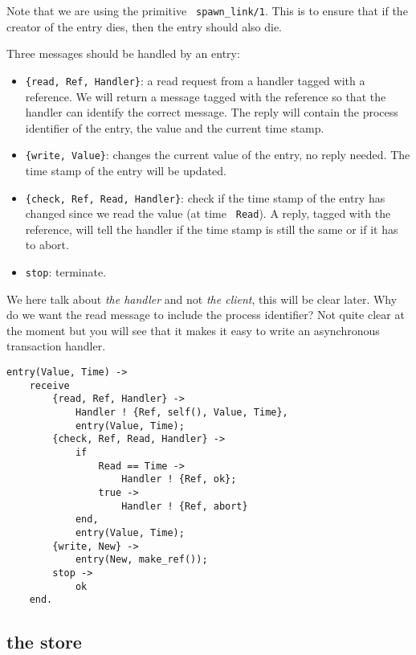 \documentclass[a4paper, 11pt]{article}
\begin{document}
\noindent Note that we are using the primitive {\tt
  spawn\_link/1}. This is to ensure that if the creator of the entry
dies, then the entry should also die.

Three messages should be handled by an entry:

\begin{itemize}

\item {\tt \{read, Ref, Handler\}}: a read request from a handler tagged
  with a reference. We will return a message tagged with the reference
  so that the handler can identify the correct message. The reply will
  contain the process identifier of the entry, the value and the
  current time stamp.

\item {\tt \{write, Value\}}: changes the current value of the entry,
  no reply needed. The time stamp of the entry will be updated.

\item {\tt \{check, Ref, Read, Handler\}}: check if the time stamp of
  the entry has changed since we read the value (at time {\tt
    Read}). A reply, tagged with the reference, will tell the handler
  if the time stamp is still the same or if it has to abort.

\item {\tt stop}: terminate.

\end{itemize}

We here talk about {\em the handler} and not {\em the client}, this
will be clear later. Why do we want the read message to include the
process identifier? Not quite clear at the moment but you will see
that it makes it easy to write an asynchronous transaction handler.

\begin{verbatim}
entry(Value, Time) ->
    receive
        {read, Ref, Handler} ->
            Handler ! {Ref, self(), Value, Time},
            entry(Value, Time);
        {check, Ref, Read, Handler} ->
            if 
                Read == Time ->
                    Handler ! {Ref, ok};
                true ->
                    Handler ! {Ref, abort}
            end,
            entry(Value, Time);
        {write, New} ->
            entry(New, make_ref());
        stop ->
            ok
    end.
\end{verbatim}

\subsection{the store}
\end{document}
